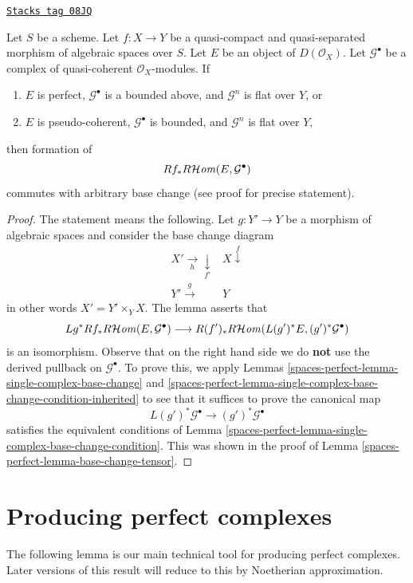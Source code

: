 \begin{lemma}
\label{spaces-perfect-lemma-base-change-RHom}
\href{https://stacks.math.columbia.edu/tag/08JQ}{\texttt{Stacks tag 08JQ}}

Let $S$ be a scheme. Let $f : X \to Y$ be a quasi-compact and
quasi-separated morphism of algebraic spaces over $S$. Let $E$
be an object of $D(\mathcal{O}_X)$. Let $\mathcal{G}^\bullet$
be a complex of quasi-coherent $\mathcal{O}_X$-modules. If
\begin{enumerate}
\item $E$ is perfect, $\mathcal{G}^\bullet$ is a bounded above,
and $\mathcal{G}^n$ is flat over $Y$, or
\item $E$ is pseudo-coherent, $\mathcal{G}^\bullet$ is bounded,
and $\mathcal{G}^n$ is flat over $Y$,
\end{enumerate}
then formation of
$$
Rf_*R\mathcal{H}\mathit{om}(E, \mathcal{G}^\bullet)
$$
commutes with arbitrary base change (see proof for precise statement).
\end{lemma}

\begin{proof}
The statement means the following. Let $g : Y' \to Y$ be a morphism of
algebraic spaces and consider the base change diagram
$$
\begin{array}{cc}X' \underset{h}{\longrightarrow}\underset{f'}{\downarrow} & X \overset{f}{\downarrow} \\ Y' \overset{g}{\longrightarrow} & Y\end{array}
$$
in other words $X' = Y' \times_Y X$. The lemma asserts that
$$
Lg^*Rf_*R\mathcal{H}\mathit{om}(E, \mathcal{G}^\bullet)
\longrightarrow
R(f')_*R\mathcal{H}\mathit{om}(L(g')^*E, (g')^*\mathcal{G}^\bullet)
$$
is an isomorphism. Observe that on the right hand side we do {\bf not}
use the derived pullback on $\mathcal{G}^\bullet$. To prove this, we apply
Lemmas \ref{spaces-perfect-lemma-single-complex-base-change} and
\ref{spaces-perfect-lemma-single-complex-base-change-condition-inherited} to see that it
suffices to prove the canonical map
$$
L(g')^*\mathcal{G}^\bullet \to (g')^*\mathcal{G}^\bullet
$$
satisfies the equivalent conditions of
Lemma \ref{spaces-perfect-lemma-single-complex-base-change-condition}.
This was shown in the proof of Lemma \ref{spaces-perfect-lemma-base-change-tensor}.
\end{proof}

\section{Producing perfect complexes}
\label{spaces-perfect-section-producing-perfect}
The following lemma is our main technical tool for producing
perfect complexes. Later versions of this result will reduce to
this by Noetherian approximation.

